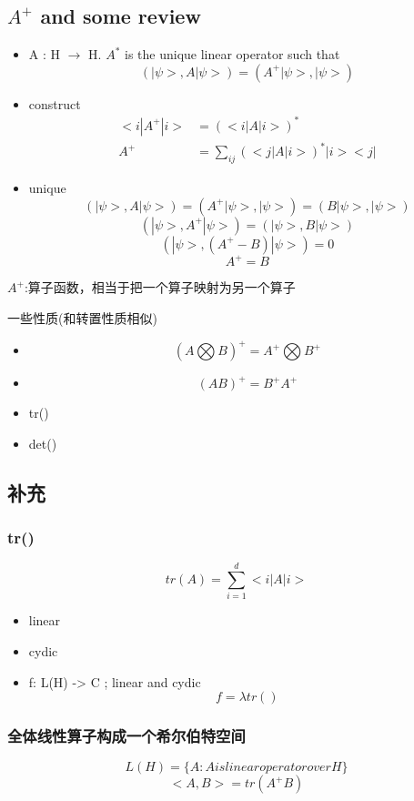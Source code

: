 \documentclass[a4paper, 11pt]{article} %
\begin{document}
\subsection*{$A^+$ and some review}
\begin{itemize}
\item
A : H $\rightarrow$ H. $A^*$ is the unique linear operator such that
$$
(|\psi>, A|\psi >) = (A^+|\psi>, |\psi >)
$$
\item
construct
\begin{align*}
<i|A^+|i> & = (<i|A|i>)^* \\
A^+ &= \sum_{ij} (<j|A|i>)^*|i><j|
\end{align*}
\item
unique
$$
(|\psi>, A|\psi >) = (A^+|\psi>, |\psi >) = (B|\psi>, |\psi >)
$$
$$
(|\psi>, A^+|\psi >) = (|\psi>, B|\psi >)
$$
$$
(|\psi>, (A^+ - B)|\psi >) = 0
$$
$$
A^+ = B
$$
\end{itemize}

$A^+$:算子函数，相当于把一个算子映射为另一个算子

一些性质(和转置性质相似)

\begin{itemize}
	\item
	$$
	(A \bigotimes B)^+ = A^+ \bigotimes B^+
	$$
	\item
	$$
	(AB)^+ = B^+A^+
	$$
	\item
	tr()
	\item 
	det()
\end{itemize}

\subsection{补充}		

\subsubsection{tr()}
$$
tr(A) = \sum_{i = 1}^d <i|A|i>
$$
\begin{itemize}
	\item
	linear
	\item
	cydic
	\item f: L(H) -> C ; linear and cydic
	$$
	f = \lambda tr()
	$$
\end{itemize}

\subsubsection{全体线性算子构成一个希尔伯特空间}
$$
L(H) = \lbrace A: A is linear operator over H \rbrace
$$
$$
<A,B> = tr(A^+B)
$$
\end{document}
